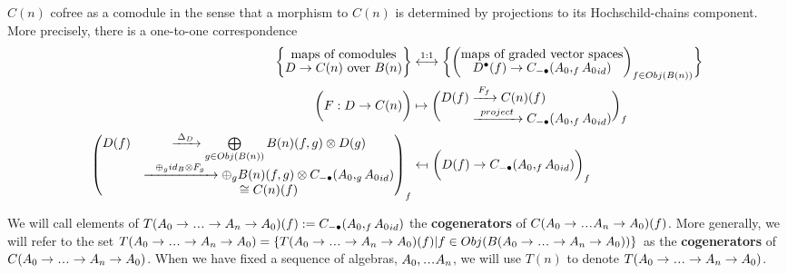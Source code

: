 $C(n)$ cofree as a comodule in the sense that 
a morphism to $C(n)$ is determined by projections
to its Hochschild-chains component.
More precisely, there is a one-to-one correspondence
\begin{equation}\label{eq:quasicofree}
\begin{split}
\bigg\{ \let\scriptstyle\textstyle
\substack{\textrm{maps of comodules}\\
  D \to C(n)\textrm{ over } B(n)}
\bigg\}
&\overset{1:1}\longleftrightarrow
\bigg\{ \bigg( \let\scriptstyle\textstyle
\substack{\textrm{maps of graded vector spaces}\\
  D^\bullet(f) \to C_{-\bullet}(A_0, _f{A_0}_{id})}
\bigg)_{f \in Obj(B(n))} \bigg\}\\
\bigg( F:D\to C(n) \bigg)
&\mapsto
\bigg( \substack{\begin{split}
  D(f) 
  &\xrightarrow{F_f} C(n)(f) \\
  &\xrightarrow{project}
  C_{-\bullet}(A_0, _f{A_0}_{id})
  \end{split}} 
  \bigg)_f\\
\begin{pmatrix}
  D(f)
  &\xrightarrow{\Delta_D}
  \bigoplus \limits_{g \in Obj(B(n))}
  B(n)(f,g) \otimes D(g)\\
  &\xrightarrow{\oplus_g id_B \otimes F_g}
  \oplus_g
  B(n)(f,g) \otimes C_{-\bullet}(A_0, _g{A_0}_{id})\\
  &\cong C(n)(f)
  \end{pmatrix} _f
&\leftmapsto  
\bigg( D(f) \to
  C_{-\bullet}(A_0, _f{A_0}_{id})
  \bigg)_f\\
\end{split}
\end{equation}
%
\begin{defn}\label{def:cogenerators}
We will call elements of 
$T(A_0 \to \smdots \to A_n \to A_0)(f) :=
C_{-\bullet}(A_0, _f{A_0}_{id})$ 
the \textbf{cogenerators} of 
$C(A_0 \to \smdots A_n \to A_0)(f)$. 
More generally, we will refer to 
the set $T(A_0 \to \smdots \to A_n \to A_0) 
= \{T(A_0 \to \smdots \to A_n \to A_0)(f) | 
f \in Obj(B(A_0 \to \smdots \to A_n \to A_0))\}$ 
as the \textbf{cogenerators} of 
$C(A_0 \to \smdots \to A_n \to A_0)$. When we 
have fixed a sequence of algebras, 
$A_0, \smdots A_n$, we will 
use $T(n)$ to denote 
$T(A_0 \to \smdots \to A_n \to A_0)$.
\end{defn}
%

%
